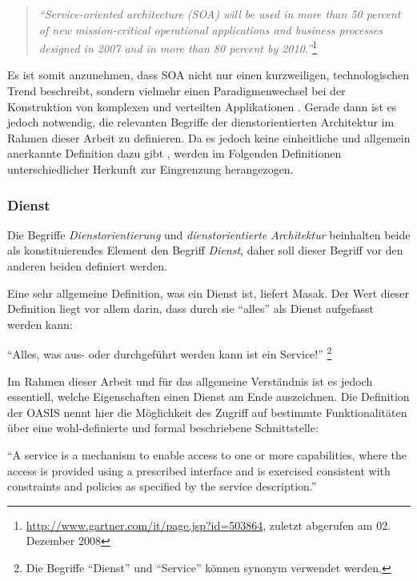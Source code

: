   \begin{quote}
    \emph{"`Service-oriented architecture (SOA) will be used in more than 50 percent of new mission-critical operational applications and business processes designed in 2007 and in more than 80 percent by 2010."'}\footnote{\url{http://www.gartner.com/it/page.jsp?id=503864}, zuletzt abgerufen am 02. Dezember 2008}
  \end{quote}
  
  Es ist somit anzunehmen, dass SOA nicht nur einen kurzweiligen, technologischen Trend beschreibt, sondern vielmehr einen Paradigmenwechsel bei der Konstruktion von komplexen und verteilten Applikationen \citep[S. 1]{service_oriented_computing}. Gerade dann ist es jedoch notwendig, die relevanten Begriffe der dienstorientierten Architektur im Rahmen dieser Arbeit zu definieren. Da es jedoch keine einheitliche und allgemein anerkannte Definition dazu gibt \citep[S. 6]{soa_goes_real}, werden im Folgenden Definitionen unterschiedlicher Herkunft zur Eingrenzung herangezogen.
  
\subsubsection{Dienst} %
\label{ssub:definitionen_dienst}

  Die Begriffe \emph{Dienstorientierung} und \emph{dienstorientierte Architektur} beinhalten beide als konstituierendes Element den Begriff \emph{Dienst}, daher soll dieser Begriff vor den anderen beiden definiert werden.
  
  Eine sehr allgemeine Definition, was ein Dienst ist, liefert Masak. Der Wert dieser Definition liegt vor allem darin, dass durch sie "`alles"' als Dienst aufgefasst werden kann:

\begin{definition}\label{def:dienst_allgemein_}
  "`Alles, was aus- oder durchgeführt werden kann ist ein Service!"' \emph{\citep[S. 16]{masak2007ssb}}\footnote{Die Begriffe "`Dienst"' und "`Service"' können synonym verwendet werden.}
\end{definition}

  Im Rahmen dieser Arbeit und für das allgemeine Verständnis ist es jedoch essentiell, welche Eigenschaften einen Dienst am Ende auszeichnen. Die Definition der OASIS nennt hier die Möglichkeit des Zugriff auf bestimmte Funktionalitäten über eine wohl-definierte und formal beschriebene Schnittstelle:

\begin{definition}\label{def:dienst_oasis_}
  "`A service is a mechanism to enable access to one or more capabilities, where the access is provided using a prescribed interface and is exercised consistent with constraints and policies as specified by the service description."' \emph{\citep[S. 12]{mackenzie2006rms}}
\end{definition}

